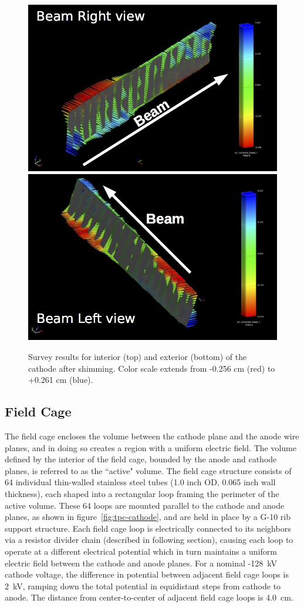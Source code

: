 \begin{figure}[htb]
\centering
\includegraphics[width=0.75\linewidth]{figures/cathode_right.jpg}
\includegraphics[width=0.75\linewidth]{figures/cathode_left.jpg}
\caption{Survey results for interior (top) and exterior (bottom) of the cathode after shimming.  Color scale extends from -0.256 cm (red) to +0.261 cm (blue).}
\label{fig:tpc-cathode-survey}
\end{figure}

\subsection{Field Cage}
The field cage encloses the volume between the cathode plane and the anode wire planes, and in doing so creates a region with a uniform electric field.  The volume defined by the interior of the field cage, bounded by the anode and cathode planes, is referred to as the ``active" volume.   The field cage structure consists of 64 individual thin-walled stainless steel tubes (1.0 inch OD, 0.065 inch wall thickness), each shaped into a rectangular loop framing the perimeter of the active volume. These 64 loops are mounted parallel to the cathode and anode planes, as shown in figure~\ref{fig:tpc-cathode}, and are held in place by a G-10 rib support structure. Each field cage loop is electrically connected to its neighbors via a resistor divider chain (described in following section), causing each loop to operate at a different electrical potential which in turn maintains a uniform electric field between the cathode and anode planes. For a nominal -128~kV cathode voltage, the difference in potential between adjacent field cage loops is 2~kV, ramping down the total potential in equidistant steps from cathode to anode. The distance from center-to-center of adjacent field cage loops is 4.0~cm.

